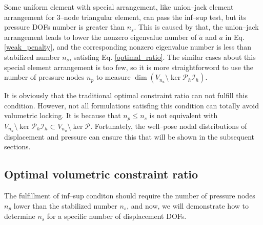 \begin{rmk}
Some uniform element with special arrangement, like union--jack element arrangement for 3--node triangular element, can pass the inf--sup test\cite{chapelle1993}, but its pressure DOFs number is greater than $n_s$.
This is caused by that,
the union--jack arrangement leads to lower the nonzero eigenvalue number of $\tilde a$ and $a$ in Eq. \eqref{weak_penalty}, and the corresponding nonzero eigenvalue number is less than stabilized number $n_s$, satisfing Eq. \eqref{optimal_ratio}.
The similar cases about this special element arrangement is too few, so it is more straightforword to use the number of pressure nodes $n_p$ to measure $\dim (V_{n_u}\setminus \ker \mathcal P_h \mathcal I_h)$.
\end{rmk}

\begin{rmk}
It is obviously that the traditional optimal constraint ratio can not fulfill this condition.
However, not all formulations satisfing this condition can totally avoid volumetric locking.
It is because that $n_p \le n_s$ is not equivalent with $V_{n_u}\setminus \ker \mathcal P_h \mathcal I_h \subset V_{n_u}\setminus \ker \mathcal P$.
Fortunately, the well--pose nodal distributions of displacement and pressure can ensure this that will be shown in the subsequent sections.
\end{rmk}

\subsection{Optimal volumetric constraint ratio}
The fulfillment of inf--sup conditon should require the number of pressure nodes $n_p$ lower than the stabilized number $n_s$, and now, we will demonstrate how to determine $n_s$ for a specific number of displacement DOFs.

